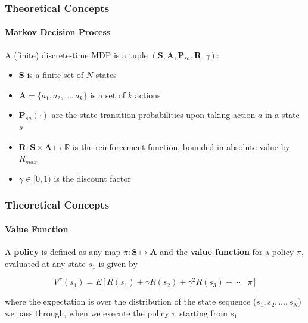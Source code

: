 \begin{frame}
	\frametitle{Theoretical Concepts}
	\framesubtitle{Markov Decision Process}
	
	\Large
	
	\vspace{0.3cm}
	
	A (finite) discrete-time MDP is a tuple $ (\mathbf{S},\mathbf{A},\mathbf{P}_{sa},
	\mathbf{R},\gamma) $:
	\vspace{0.1cm}
	\begin{itemize}
		\item $ \mathbf{S} $ is a finite set of $ N $ states
		\vspace{0.1cm}
		\item $ \mathbf{A} = \{ a_1, a_2, \ldots, a_k \} $ is a set of $ k $ actions
		\vspace{0.1cm}
		\item $ \mathbf{P}_{sa}(\cdot) $ are the state transition probabilities upon taking
			  action $ a $ in a state $ s $
		\vspace{0.1cm}
		\item $ \mathbf{R} : \mathbf{S} \times \mathbf{A}  \mapsto \mathds{R} $ is the
			  reinforcement function, bounded in absolute value by $ R_{max} $
		\vspace{0.1cm}
		\item $ \gamma \in [0,1) $ is the discount factor
		\vspace{0.1cm}
	\end{itemize}
\end{frame}

\begin{frame}
	\frametitle{Theoretical Concepts}
	\framesubtitle{Value Function}
	
	\Large
	
	\vspace{0.2cm}
	
	A \textbf{policy} is defined as any map $ \pi : \mathbf{S} \mapsto \mathbf{A} $ and the
	\textbf{value function} for a policy $ \pi $, evaluated at any state $ s_1 $ is given by\\
	
	\vspace{-0.5cm}
	
	\begin{equation*}
		V^\pi(s_1) = E \, \Big [ \, R(s_1) + \gamma R(s_2) + \gamma^2 R(s_3) + \cdots \; | \;
		\pi \, \Big ]
	\end{equation*}
	
	where the expectation is over the distribution of the state sequence ($ s_1, s_2, \ldots,
	s_N $) we pass through, when we execute the policy $ \pi $ starting from $ s_1 $\\
\end{frame}

